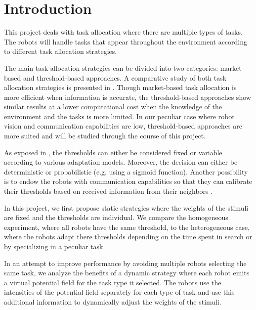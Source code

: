 \section{Introduction}
This project deals with task allocation where there are multiple types of tasks. The robots will handle tasks that appear throughout the environment according to different task allocation strategies.

The main task allocation strategies can be divided into two categories: market-based and threshold-based approaches. A comparative study of both task allocation strategies is presented in \cite{1}. Though market-based task allocation is more efficient when information is accurate, the threshold-based approaches show similar results at a lower computational cost when the knowledge of the environment and the tasks is more limited. In our peculiar case where robot vision and communication capabilities are low, threshold-based approaches are more suited and will be studied through the course of this project.

As exposed in \cite{2}, the thresholds can either be considered fixed or variable according to various adaptation models. Moreover, the decision can either be deterministic or probabilistic (e.g. using a sigmoid function). Another possibility is to endow the robots with communication capabilities so that they can calibrate their thresholds based on received information from their neighbors \cite{3}.

In this project, we first propose static strategies where the weights of the stimuli are fixed and the thresholds are individual. We compare the homogeneous experiment, where all robots have the same threshold, to the heterogeneous case, where the robots adapt there thresholds depending on the time spent in search or by specializing in a peculiar task.

In an attempt to improve performance by avoiding multiple robots selecting the same task, we analyze the benefits of a dynamic strategy where each robot emits a virtual potential field for the task type it selected. The robots use the intensities of the potential field separately for each type of task and use this additional information to dynamically adjust the weights of the stimuli.

